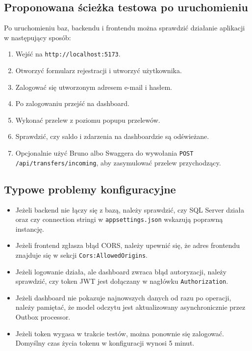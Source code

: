 \documentclass[12pt,a4paper]{article}
\begin{document}
\subsection{Proponowana ścieżka testowa po uruchomieniu}

Po uruchomieniu baz, backendu i frontendu można sprawdzić działanie aplikacji w następujący sposób:
\begin{enumerate}[nosep]
    \item Wejść na \texttt{http://localhost:5173}.
    \item Otworzyć formularz rejestracji i utworzyć użytkownika.
    \item Zalogować się utworzonym adresem e-mail i hasłem.
    \item Po zalogowaniu przejść na dashboard.
    \item Wykonać przelew z poziomu popupu przelewów.
    \item Sprawdzić, czy saldo i zdarzenia na dashboardzie są odświeżane.
    \item Opcjonalnie użyć Bruno albo Swaggera do wywołania \texttt{POST /api/transfers/incoming}, aby zasymulować przelew przychodzący.
\end{enumerate}

\subsection{Typowe problemy konfiguracyjne}

\begin{itemize}
    \item Jeżeli backend nie łączy się z bazą, należy sprawdzić, czy SQL Server działa oraz czy connection stringi w \texttt{appsettings.json} wskazują poprawną instancję.
    \item Jeżeli frontend zgłasza błąd CORS, należy upewnić się, że adres frontendu znajduje się w sekcji \texttt{Cors:AllowedOrigins}.
    \item Jeżeli logowanie działa, ale dashboard zwraca błąd autoryzacji, należy sprawdzić, czy token JWT jest dołączany w nagłówku \texttt{Authorization}.
    \item Jeżeli dashboard nie pokazuje najnowszych danych od razu po operacji, należy pamiętać, że model odczytu jest aktualizowany asynchronicznie przez Outbox processor.
    \item Jeżeli token wygasa w trakcie testów, można ponownie się zalogować. Domyślny czas życia tokenu w konfiguracji wynosi 5 minut.
\end{itemize}
\end{document}

